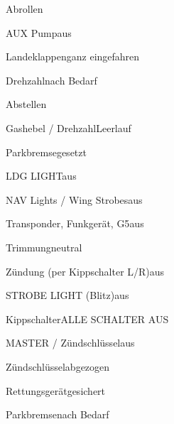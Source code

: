 \begin{checklist}{Abrollen}
	\item{AUX Pump}{aus}
	\item{Landeklappen}{ganz eingefahren}
	\item{Drehzahl}{nach Bedarf}
\end{checklist}

\begin{checklist}{Abstellen}
	  \item{Gashebel / Drehzahl}{Leerlauf}
	  \item{Parkbremse}{gesetzt}
	  \item{LDG LIGHT}{aus}
	  \item{NAV Lights / Wing Strobes}{aus}
	  \item{Transponder, Funkgerät, G5}{aus}
	  \item{Trimmung}{neutral}
	  \item{Zündung (per Kippschalter L/R)}{aus}
	  



	\item{STROBE LIGHT (Blitz)}{aus}
	\item{Kippschalter}{ALLE SCHALTER AUS}
	\item{MASTER / Zündschlüssel}{aus}
	\item{Zündschlüssel}{abgezogen}
	\item{Rettungsgerät}{gesichert}
    	  
	  \item{Parkbremse}{nach Bedarf}
\end{checklist}

